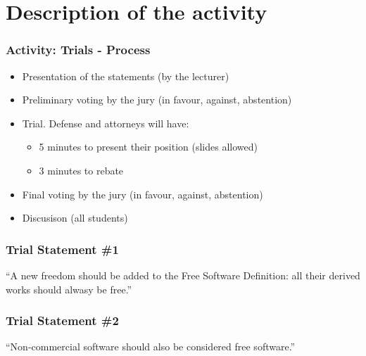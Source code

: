 

\section{Description of the activity}


\begin{frame}
\frametitle{Activity: Trials - Process}

\begin{itemize}
\item Presentation of the statements (by the lecturer)
\item Preliminary voting by the jury (in favour, against, abstention)
\item Trial. Defense and attorneys will have:
\begin{itemize}
  \item 5 minutes to present their position (slides allowed)
  \item 3 minutes to rebate
\end{itemize}
\item Final voting by the jury (in favour, against, abstention)
\item Discusison (all students)
\end{itemize}

\end{frame}


\begin{frame}
\frametitle{Trial Statement \#1}

\begin{center}
\begin{LARGE}
``A new freedom should be added to the Free Software Definition:
all their derived works should alwasy be free.''
\end{LARGE}
\end{center}

\end{frame}



\begin{frame}
\frametitle{Trial Statement \#2}

\begin{center}
\begin{LARGE}
``Non-commercial software should also be considered free software.''
\end{LARGE}
\end{center}

\end{frame}



